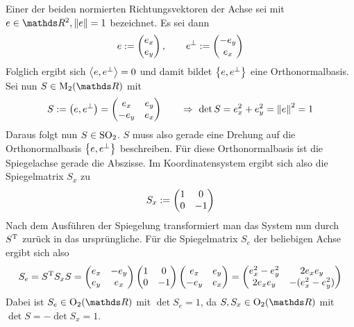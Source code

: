 			Einer der beiden normierten Richtungsvektoren der Achse sei mit $e\in\SR^2, \norm{e} = 1$ bezeichnet.
			Es sei dann
			\[
				e := \left( 
					\begin{matrix}
						e_x \\ e_y
					\end{matrix}
				 \right),
				\qquad
				e^\perp := \left( 
					\begin{matrix}
						-e_y \\ e_x
					\end{matrix}
				 \right)
			\]
			Folglich ergibt sich $\left\langle e,e^\perp \right\rangle = 0$ und damit bildet $\left\{ e,e^\perp \right\}$ eine Orthonormalbasis.
			Sei nun $S\in \m{M}_2(\SR)$ mit
			\[
				S := \left( e,e^\perp \right) = \left( 
					\begin{matrix}
						e_x & e_y \\ -e_y & e_x
					\end{matrix}
				 \right)\qquad
				\Rightarrow \ \det S = e_x^2 + e_y^2 = \left\| e \right\|^2 = 1
			\]
			Daraus folgt nun $S \in \mathrm{SO}_2$.
			$S$ muss also gerade eine Drehung auf die Orthonormalbasis $\left\{ e,e^\perp \right\}$ beschreiben.
			Für diese Orthonormalbasis ist die Spiegelachse gerade die Abszisse.
			Im Koordinatensystem ergibt sich also die Spiegelmatrix $S_x$ zu
			\[
				S_x :=\left( 
					\begin{matrix}
						1 & 0 \\ 0 & -1	
					\end{matrix}	
				 \right)
			\]
			Nach dem Ausführen der Spiegelung transformiert man das System nun durch $S^{\mathrm{T}}$ zurück in das ursprüngliche.
			Für die Spiegelmatrix $S_e$ der beliebigen Achse ergibt sich also
			\[
				S_e = S^{\mathrm{T}}S_xS =
				\left( 
					\begin{matrix}
						e_x & -e_y \\ e_y & e_x
					\end{matrix}
				 \right)
				\left( 
					\begin{matrix}
						1 & 0 \\ 0 & -1	
					\end{matrix}	
				 \right)\left( 
					\begin{matrix}
						e_x & e_y \\ -e_y & e_x
					\end{matrix}
				 \right) = \left( 
					\begin{matrix}
						e_x^2 - e_y^2 & 2e_xe_y \\ 2e_xe_y & -(e_x^2 - e_y^2)
					\end{matrix}
				 \right)
			\]
			Dabei ist $S_e\in\m{O}_2(\SR)$ mit $\det S_e = 1$, da $S,S_x\in\m{O}_2(\SR)$ mit $\det S = -\det S_x = 1$.

